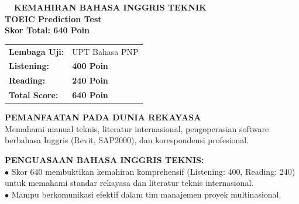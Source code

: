 \documentclass[10pt,a4paper,landscape]{article}
\begin{document}
\noindent
\begin{minipage}[t]{0.30\linewidth}
  \vspace{0pt}
  \begin{tcolorbox}[sharp corners, boxrule=0.8pt, colframe=pborder, colback=white, left=3mm, right=3mm, top=2.5mm, bottom=2.5mm, height=100mm]
    \colorbox{pred}{\fontsize{7pt}{8pt}\selectfont\bfseries\color{white}\ \ KEMAHIRAN BAHASA INGGRIS TEKNIK\ \ }\\[1.5mm]
    {\fontsize{9.5pt}{11.5pt}\selectfont\bfseries\color{pnavy}TOEIC Prediction Test}\\[0.5mm]
    {\fontsize{7pt}{8.5pt}\selectfont\bfseries\color{pred}Skor Total: 640 Poin}\\[2mm]

    \begin{tcolorbox}[sharp corners, boxrule=0.5pt, colframe=pborder, colback=pbglight, left=2mm, right=2mm, top=1.5mm, bottom=1.5mm]
      \begin{tabularx}{\linewidth}{@{}p{22mm} X@{}}
        {\fontsize{6.8pt}{8pt}\selectfont\bfseries Lembaga Uji:} & {\fontsize{6.8pt}{8pt}\selectfont UPT Bahasa PNP} \\[0.8mm]
        {\fontsize{6.8pt}{8pt}\selectfont\bfseries Listening:} & {\fontsize{6.8pt}{8pt}\selectfont\bfseries 400 Poin} \\[0.8mm]
        {\fontsize{6.8pt}{8pt}\selectfont\bfseries Reading:} & {\fontsize{6.8pt}{8pt}\selectfont\bfseries 240 Poin} \\[0.8mm]
        {\fontsize{6.8pt}{8pt}\selectfont\bfseries Total Score:} & {\fontsize{6.8pt}{8pt}\selectfont\bfseries\color{pred} 640 Poin}
      \end{tabularx}
    \end{tcolorbox}
    \vspace{1.5mm}

    {\fontsize{7.5pt}{9pt}\selectfont\bfseries\color{pnavy}PEMANFAATAN PADA DUNIA REKAYASA}\\[0.8mm]
    {\fontsize{6.5pt}{8.2pt}\selectfont\color{psteel}
    Memahami manual teknis, literatur internasional, pengoperasian software berbahasa Inggris (Revit, SAP2000), dan korespondensi profesional.
    }
  \end{tcolorbox}
  \vspace{2mm}

  \begin{tcolorbox}[sharp corners, boxrule=0.6pt, colframe=pnavy, colback=pbglight, left=2.5mm, right=2.5mm, top=2mm, bottom=2mm, height=52mm]
    {\fontsize{7pt}{8.5pt}\selectfont\bfseries\color{pnavy}PENGUASAAN BAHASA INGGRIS TEKNIS:}\\[1.5mm]
    {\fontsize{6.5pt}{8.2pt}\selectfont\color{psteel}
    $\bullet$ Skor 640 membuktikan kemahiran komprehensif (Listening: 400, Reading: 240) untuk memahami standar rekayasa dan literatur teknis internasional.\\
    $\bullet$ Mampu berkomunikasi efektif dalam tim manajemen proyek multinasional.
    }
  \end{tcolorbox}
\end{minipage}%
\end{document}
